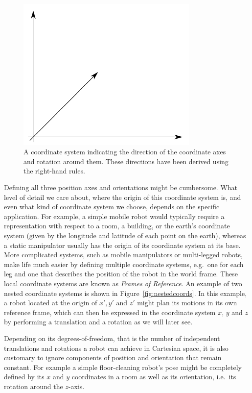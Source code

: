 \begin{figure}
	\centering
		\includegraphics[width=0.8\textwidth]{figs/coordinatesystem}
	\caption{A coordinate system indicating the direction of the coordinate axes and rotation around them. These directions have been derived using the right-hand rules.}
	\label{fig:coordinatesystem}
\end{figure}

Defining all three position axes and orientations might be cumbersome. What level of detail we care about, where the origin of this coordinate system is, and even what kind of coordinate system we choose, depends on the specific application. For example, a simple mobile robot would typically require a representation with respect to a room, a building, or the earth's coordinate system (given by the longitude and latitude of each point on the earth), whereas a static manipulator usually has the origin of its coordinate system at its base. More complicated systems, such as mobile manipulators or multi-legged robots, make life much easier by defining multiple coordinate systems, e.g.\ one for each leg and one that describes the position of the robot in the world frame. These local coordinate systems are known as \emph{Frames of Reference}.
An example of two nested coordinate systems is shown in Figure~\ref{fig:nestedcoords}. In this example, a robot located at the origin of $x',y'$ and $z'$ might plan its motions in its own reference frame, which can then be expressed in the coordinate system $x$, $y$ and $z$ by performing a translation and a rotation as we will later see.

Depending on its degrees-of-freedom, that is the number of independent translations and rotations a robot can achieve in Cartesian space, it is also customary to ignore components of position and orientation that remain constant. For example a simple floor-cleaning robot's pose might be completely defined by its $x$ and $y$ coordinates in a room as well as its orientation, i.e.\ its rotation around the $z$-axis.


